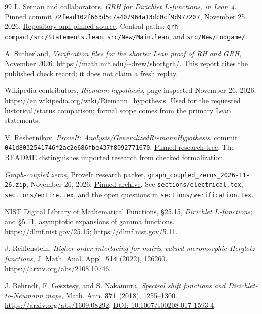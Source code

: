 \begin{thebibliography}{99}
L. Sernau and collaborators, \emph{GRH for Dirichlet $L$-functions, in Lean 4}.
Pinned commit \texttt{72fead102f663d5c7a407964a13dc0cf9d977207}, November 25, 2026.
\href{https://github.com/lsernau/grh-lean/tree/72fead102f663d5c7a407964a13dc0cf9d977207}{Repository and pinned source}.
Central paths: \texttt{grh-compact/src/Statements.lean},
\texttt{src/New/Main.lean}, and \texttt{src/New/Endgame/}.

A. Sutherland, \emph{Verification files for the shorter Lean proof of RH and GRH},
November 2026. \url{https://math.mit.edu/~drew/shortgrh/}.
This report cites the published check record; it does not claim a fresh replay.

Wikipedia contributors, \emph{Riemann hypothesis}, page inspected November 26, 2026.
\url{https://en.wikipedia.org/wiki/Riemann_hypothesis}.
Used for the requested historical/status comparison; formal scope comes from
the primary Lean statements.

V. Reshetnikov, \emph{ProveIt: Analysis/GeneralizedRiemannHypothesis},
commit \texttt{041d8032541746f2ac2e686fbe437f8092771670}.
\href{https://github.com/VladimirReshetnikov/ProveIt/tree/041d8032541746f2ac2e686fbe437f8092771670/Analysis/GeneralizedRiemannHypothesis}{Pinned research tree}.
The README distinguishes imported research from checked formalization.

\emph{Graph-coupled zeros}, ProveIt research packet,
\texttt{graph\_coupled\_zeros\_2026-11-26.zip}, November 26, 2026.
\href{https://github.com/VladimirReshetnikov/ProveIt/blob/041d8032541746f2ac2e686fbe437f8092771670/Analysis/GeneralizedRiemannHypothesis/docs/incoming/graph_coupled_zeros_2026-11-26.zip}{Pinned archive}.
See \texttt{sections/electrical.tex}, \texttt{sections/entire.tex}, and the
open questions in \texttt{sections/verification.tex}.

NIST Digital Library of Mathematical Functions, \S25.15,
\emph{Dirichlet $L$-functions}; and \S5.11, asymptotic expansions of gamma functions.
\url{https://dlmf.nist.gov/25.15}; \url{https://dlmf.nist.gov/5.11}.

J. Reiffenstein, \emph{Higher-order interlacing for matrix-valued meromorphic
Herglotz functions}, J. Math. Anal. Appl. \textbf{514} (2022), 126260.
\url{https://arxiv.org/abs/2108.10746}.

J. Behrndt, F. Gesztesy, and S. Nakamura, \emph{Spectral shift functions and
Dirichlet-to-Neumann maps}, Math. Ann. \textbf{371} (2018), 1255--1300.
\url{https://arxiv.org/abs/1609.08292};
\href{https://doi.org/10.1007/s00208-017-1593-4}{DOI: 10.1007/s00208-017-1593-4}.


\end{thebibliography}
